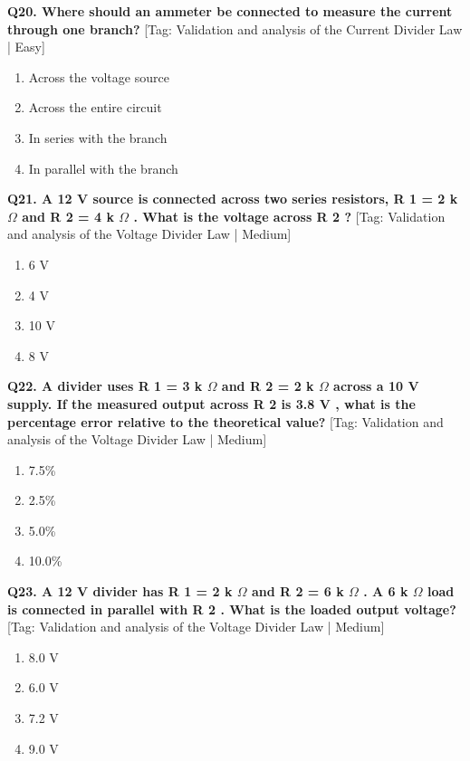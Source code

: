 \noindent\textbf{Q20. Where should an ammeter be connected to measure the current through one branch?} \hfill [Tag: Validation and analysis of the Current Divider Law | Easy]
\begin{enumerate}[label=(\alph*),topsep=2pt,itemsep=1pt,partopsep=0pt,parsep=0pt]
    \item {Across the voltage source}
    \item {Across the entire circuit}
    \item {In series with the branch}
    \item {In parallel with the branch}
\end{enumerate}
\vspace{2mm}

\noindent\textbf{Q21. A 12 V source is connected across two series resistors, R 1 = 2 k $\Omega$ and R 2 = 4 k $\Omega$ . What is the voltage across R 2 ?} \hfill [Tag: Validation and analysis of the Voltage Divider Law | Medium]
\begin{enumerate}[label=(\alph*),topsep=2pt,itemsep=1pt,partopsep=0pt,parsep=0pt]
    \item {6 V}
    \item {4 V}
    \item {10 V}
    \item {8 V}
\end{enumerate}
\vspace{2mm}

\noindent\textbf{Q22. A divider uses R 1 = 3 k $\Omega$ and R 2 = 2 k $\Omega$ across a 10 V supply. If the measured output across R 2 is 3.8 V , what is the percentage error relative to the theoretical value?} \hfill [Tag: Validation and analysis of the Voltage Divider Law | Medium]
\begin{enumerate}[label=(\alph*),topsep=2pt,itemsep=1pt,partopsep=0pt,parsep=0pt]
    \item {7.5\%}
    \item {2.5\%}
    \item {5.0\%}
    \item {10.0\%}
\end{enumerate}
\vspace{2mm}

\noindent\textbf{Q23. A 12 V divider has R 1 = 2 k $\Omega$ and R 2 = 6 k $\Omega$ . A 6 k $\Omega$ load is connected in parallel with R 2 . What is the loaded output voltage?} \hfill [Tag: Validation and analysis of the Voltage Divider Law | Medium]
\begin{enumerate}[label=(\alph*),topsep=2pt,itemsep=1pt,partopsep=0pt,parsep=0pt]
    \item {8.0 V}
    \item {6.0 V}
    \item {7.2 V}
    \item {9.0 V}
\end{enumerate}
\vspace{2mm}

